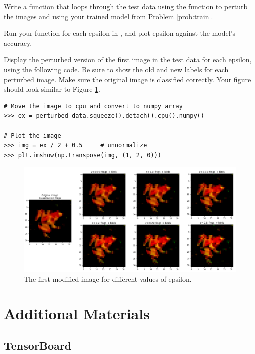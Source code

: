 \begin{problem}
Write a function that loops through the test data using the function  to perturb the images and using your trained model from Problem \ref{prob:train}.

Run your function for each epsilon in \li{[0, 0.05, 0.1, 0.15, 0.2, 0.25, 0.3]}, and plot epsilon against the model's accuracy.

Display the perturbed version of the first image in the test data for each epsilon, using the following code. Be sure to show the old and new labels for each perturbed image. Make sure the original image is classified correctly.
Your figure should look similar to Figure \ref{fig:perturbed}.

\begin{lstlisting}
# Move the image to cpu and convert to numpy array
>>> ex = perturbed_data.squeeze().detach().cpu().numpy()

# Plot the image
>>> img = ex / 2 + 0.5     # unnormalize
>>> plt.imshow(np.transpose(img, (1, 2, 0)))
\end{lstlisting}

\label{problem:adv}
\end{problem}

\begin{figure}[H] 
\includegraphics[width=\textwidth]{figures/perturbed-2.png}
\caption{The first modified image for different values of epsilon.}
\label{fig:perturbed}
\end{figure}


\section*{Additional Materials}
\subsection*{TensorBoard}

